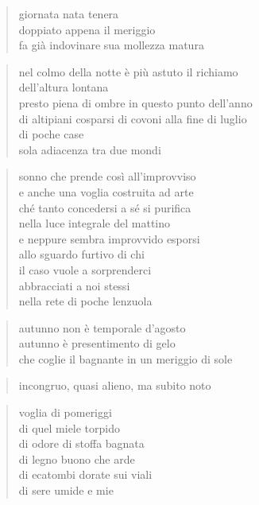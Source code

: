 \clearpage


\begin{verse}
    giornata nata tenera\\
    doppiato appena il meriggio\\
    fa già indovinare sua mollezza matura
\end{verse}

\clearpage


\begin{verse}
    nel colmo della notte è più astuto il richiamo\\
    dell'altura lontana\\
    presto piena di ombre in questo punto dell'anno\\
    di altipiani cosparsi di covoni alla fine di luglio\\
    di poche case\\
    sola adiacenza tra due mondi
\end{verse}

\clearpage


\begin{verse}
    sonno che prende così all'improvviso\\
    e anche una voglia costruita ad arte\\
    ché tanto concedersi a sé si purifica\\
    nella luce integrale del mattino\\
    e neppure sembra improvvido esporsi\\
    allo sguardo furtivo di chi\\
    il caso vuole a sorprenderci\\
    abbracciati a noi stessi\\
    nella rete di poche lenzuola
\end{verse}

\clearpage


\begin{verse}
    autunno non è temporale d'agosto\\
    autunno è presentimento di gelo\\
    che coglie il bagnante in un meriggio di sole
\end{verse}

\begin{verse}
    incongruo, quasi alieno, ma subito noto
\end{verse}

\clearpage


\begin{verse}
    voglia di pomeriggi\\
    di quel miele torpido\\
    di odore di stoffa bagnata\\
    di legno buono che arde\\
    di ecatombi dorate sui viali\\
    di sere umide e mie
\end{verse}
